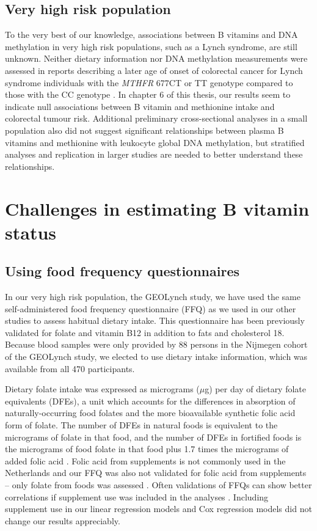 \subsection{Very high risk population} %
To the very best of our knowledge, associations between B vitamins and DNA methylation in very high risk populations, such as a Lynch syndrome, are still unknown. Neither dietary information nor DNA methylation measurements were assessed in reports describing a later age of onset of colorectal cancer for Lynch syndrome individuals with the \emph{MTHFR} 677CT or TT genotype compared to those with the CC genotype \cite{c715,c16}. In chapter 6 of this thesis, our results seem to indicate null associations between B vitamin and methionine intake and colorectal tumour risk. Additional preliminary cross-sectional analyses in a small population also did not suggest significant relationships between plasma B vitamins and methionine with leukocyte global DNA methylation, but stratified analyses and replication in larger studies are needed to better understand these relationships. 
 
\section{Challenges in estimating B vitamin status} %
\subsection{Using food frequency questionnaires} %
In our very high risk population, the GEOLynch study, we have used the same self-administered food frequency questionnaire (FFQ) as we used in our other studies to assess habitual dietary intake. This questionnaire has been previously validated for folate and vitamin B12 \cite{c717} in addition to fats and cholesterol 18. Because blood samples were only provided by 88 persons in the Nijmegen cohort of the GEOLynch study, we elected to use dietary intake information, which was available from all 470 participants. 
 
\noindent Dietary folate intake was expressed as micrograms ($\mu$g) per day of dietary folate equivalents (DFEs), a unit which accounts for the differences in absorption of naturally-occurring food folates and the more bioavailable synthetic folic acid form of folate. The number of DFEs in natural foods is equivalent to the micrograms of folate in that food, and the number of DFEs in fortified foods is the micrograms of food folate in that food plus 1.7 times the micrograms of added folic acid \cite{c719}. Folic acid from supplements is not commonly used in the Netherlands \cite{c720} and our FFQ was also not validated for folic acid from supplements -- only folate from foods was assessed \cite{c717}. Often validations of FFQs can show better correlations if supplement use was included in the analyses \cite{c721,c722,c723}. Including supplement use in our linear regression models and Cox regression models did not change our results appreciably. 
 
